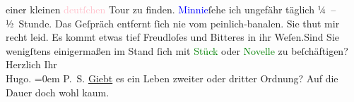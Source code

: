                     einer kleinen \textcolor{pink}{deutſchen}{}\ledrightnote{\textcolor{pink}{Deutschland}} Tour zu finden.\pend
           \pstart
           \textcolor{blue}{Minnie}{}\ledrightnote{\textcolor{blue}{Hermine von Schaffgotsch}}{ }ſehe ich ungefähr täglich ¼ –
                    ½ Stunde. Das Geſpräch entfernt ſich nie vom peinlich-banalen. Sie thut mir
                    recht leid. Es kommt etwas tief Freudloſes und Bitteres in ihr Weſen.\hspace*{1.5em}Sind Sie wenigſtens {\pb}einigermaßen im Stand ſich
                    mit \textcolor{green}{Stück}{} oder \textcolor{green}{Novelle}{} zu beſchäftigen?\pend
           \pstart
           Herzlich Ihr{\\[\baselineskip]}\spacefill\mbox{Hugo.}\pend
           \leftskip=0em{}\pstart
           \noindent{}\textsc{P. S.}{ }\uline{Giebt} es ein Leben zweiter oder dritter
                        Ordnung? Auf die Dauer doch wohl kaum.\pend
           \endnumbering{}  
      